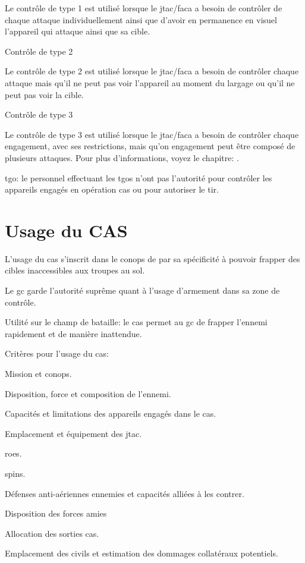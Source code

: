         Le contrôle de type 1 est utilisé lorsque le \gls{jtac}/\gls{faca} a besoin de contrôler de chaque attaque individuellement ainsi que d'avoir en permanence en visuel l'appareil qui attaque ainsi que sa cible.
        \item
        Contrôle de type 2

        Le contrôle de type 2 est utilisé lorsque le \gls{jtac}/\gls{faca} a besoin de contrôler chaque attaque mais qu'il ne peut pas voir l'appareil au moment du largage ou qu'il ne peut pas voir la cible.
        \item
        Contrôle de type 3

        Le contrôle de type 3 est utilisé lorsque le \gls{jtac}/\gls{faca} a besoin de contrôler chaque engagement, avec ses restrictions, mais qu'on engagement peut être composé de plusieurs attaques.
    \ed
    Pour plus d'informations, voyez le chapitre: .
    \item \gls{tgo}: le personnel effectuant les \glspl{tgo} n'ont pas l'autorité pour contrôler les appareils engagés en opération \gls{cas} ou pour autoriser le tir.
\ed
    
\section{Usage du CAS}

\e
	\item
	L'usage du \gls{cas} s'inscrit dans le \gls{conops} de par sa spécificité à pouvoir frapper des cibles inaccessibles aux troupes au sol.
	
	\item
	Le \gls{gc} garde l'autorité suprême quant à l'usage d'armement dans sa zone de contrôle.
	
	\item
	Utilité sur le champ de bataille: le \gls{cas} permet au \gls{gc} de frapper l'ennemi rapidement et de manière inattendue.
	
	\item Critères pour l'usage du \gls{cas}:
	
	\ee
		\item Mission et \gls{conops}.
		\item Disposition, force et composition de l'ennemi.
		\item Capacités et limitations des appareils engagés dans le \gls{cas}.
		\item Emplacement et équipement des \gls{jtac}.
		\item \glspl{roe}.
		\item \gls{spins}.
		\item Défenses anti-aériennes ennemies et capacités alliées à les contrer.
		\item Disposition des forces amies
		\item Allocation des sorties \gls{cas}.
		\item Emplacement des civils et estimation des dommages collatéraux potentiels.	
	\ed
	
